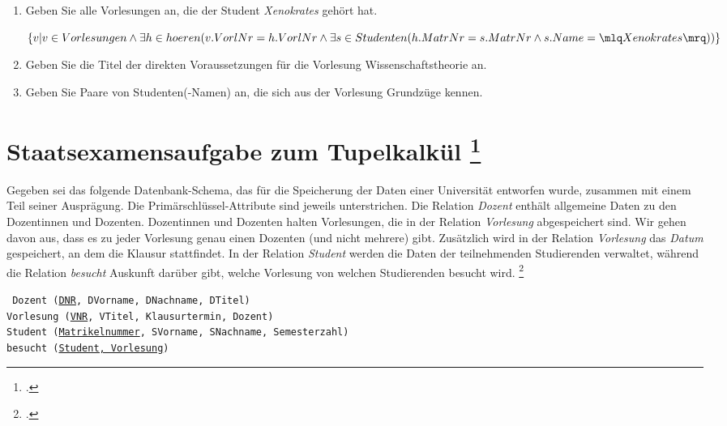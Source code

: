 \documentclass{lehramt-informatik}
\begin{document}
\begin{enumerate}
\item Geben Sie alle Vorlesungen an, die der Student
\emph{Xenokrates} gehört hat.

\begin{antwort}[muster]
$\{
  v |
  v \in Vorlesungen \land
  \exists h \in hoeren(
    v.VorlNr = h.VorlNr \land
    \exists s \in Studenten(
      h.MatrNr = s.MatrNr \land s.Name = \mlq Xenokrates \mrq
    )
  )
\}
$
\end{antwort}

\item Geben Sie die Titel der direkten Voraussetzungen für die
Vorlesung Wissenschaftstheorie an.

\item Geben Sie Paare von Studenten(-Namen) an, die sich aus
der Vorlesung Grundzüge kennen.

\end{enumerate}

%

\section{Staatsexamensaufgabe zum Tupelkalkül
\footcite[Seite 12-13, Frühjahr 2018, 66116, T2, A4]{examen:66116:2018:03}}

Gegeben sei das folgende Datenbank-Schema, das für die Speicherung der
Daten einer Universität entworfen wurde, zusammen mit einem Teil seiner
Ausprägung. Die Primärschlüssel-Attribute sind jeweils unterstrichen.
Die Relation \emph{Dozent} enthält allgemeine Daten zu den Doz\-entinnen
und Dozenten. Dozentinnen und Dozenten halten Vorlesungen, die in der
Relation \emph{Vorlesung} abgespeichert sind. Wir gehen davon aus, dass
es zu jeder Vorlesung genau einen Dozenten (und nicht mehrere) gibt.
Zusätzlich wird in der Relation \emph{Vorlesung} das \emph{Datum}
gespeichert, an dem die Klausur stattfindet. In der Relation
\emph{Student} werden die Daten der teilnehmenden Studierenden
verwaltet, während die Relation \emph{besucht} Auskunft darüber gibt,
welche Vorlesung von welchen Studierenden besucht wird.
\footcite[Seite 4-5]{db:ab:3}

\begin{mdframed}
\tt
Dozent (\underline{DNR}, DVorname, DNachname, DTitel)\\
Vorlesung (\underline{VNR}, VTitel, Klausurtermin, Dozent)\\
Student (\underline{Matrikelnummer}, SVorname, SNachname, Semesterzahl)\\
besucht (\underline{Student, Vorlesung})
\end{mdframed}
\end{document}
